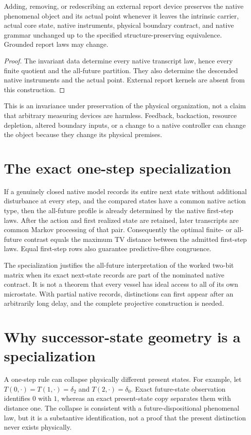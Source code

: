 \begin{proposition}\label{prop:apparatus-invariance}
Adding, removing, or redescribing an external report device preserves
the native phenomenal object and its actual point whenever it leaves
the intrinsic carrier, actual core state, native instruments, physical
boundary contract, and native grammar unchanged up to the specified
structure-preserving equivalence. Grounded report laws may change.
\end{proposition}
\begin{proof}
The invariant data determine every native transcript law, hence every
finite quotient and the all-future partition. They also determine the
descended native instruments and the actual point. External report
kernels are absent from this construction.
\end{proof}

This is an invariance under preservation of the physical organization,
not a claim that arbitrary measuring devices are harmless. Feedback,
backaction, resource depletion, altered boundary inputs, or a change
to a native controller can change the object because they change its
physical premises.

\section{The exact one-step specialization}
\label{sec:spc2-full-state-specialization}
If a genuinely closed native model records its entire next state
without additional disturbance at every step, and the compared states have a common native action type, then the all-future
profile is already determined by the native first-step laws. After
the action and first realized state are retained, later transcripts
are common Markov processing of that pair. Consequently the optimal
finite- or all-future contrast equals the maximum TV distance between
the admitted first-step laws. Equal first-step rows also guarantee
predictive-fibre congruence.

The specialization justifies the all-future interpretation of the
worked two-bit matrix when its exact next-state records are part of
the nominated native contract. It is not a theorem that every vessel
has ideal access to all of its own microstate. With partial native
records, distinctions can first appear after an arbitrarily long
delay, and the complete projective construction is needed.


\section{Why successor-state geometry is a specialization}\label{sec:successor-choice}
A one-step rule can collapse physically different present states. For example, let $T(0,\cdot)=T(1,\cdot)=\delta_2$ and $T(2,\cdot)=\delta_0$. Exact future-state observation identifies $0$ with $1$, whereas an exact present-state copy separates them with distance one. The collapse is consistent with a future-dispositional phenomenal law, but it is a substantive identification, not a proof that the present distinction never exists physically.

